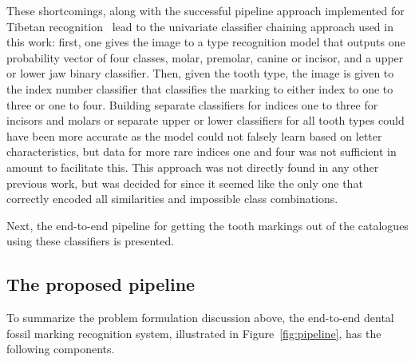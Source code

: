 \documentclass[english,twoside,openright]{UH_DS_MSc}
\begin{document}
These shortcomings, along with the successful pipeline approach implemented for Tibetan recognition~\cite{4zhaoTibetan}
lead to the univariate classifier chaining approach used in this work: first, one gives the image to a type recognition 
model that outputs one probability vector of four classes, molar, premolar, canine or incisor, and a upper or lower jaw 
binary classifier. Then, given the tooth type, the image is given to the index number classifier that classifies the marking 
to either index to one to three or one to four. Building separate classifiers for indices one to three for incisors and molars
or separate upper or lower classifiers for all tooth types 
could have been more accurate as the model could not falsely learn based on letter characteristics, but data for more rare indices 
one and four was not sufficient in amount to facilitate this.
This approach was not directly found in any other previous work, but was decided 
for since it seemed like the only one that correctly encoded all similarities and impossible class combinations. 

Next, the end-to-end pipeline for getting the tooth markings out of the catalogues using these classifiers is presented.

\subsection{The proposed pipeline}
\label{sect:pipeline}
   
To summarize the problem formulation discussion above, the end-to-end dental fossil marking recognition system,
illustrated in Figure~\ref{fig:pipeline}, has 
the following components. 
\end{document}
